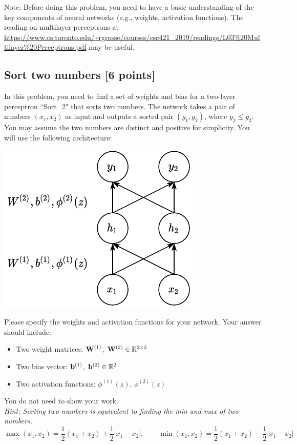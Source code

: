 \documentclass[11pt]{article}
\begin{document}
    \noindent Note: Before doing this problem, you need to have a basic understanding of the key components of neural networks (e.g., weights, activation functions). The reading on multilayer perceptrons at \url{https://www.cs.toronto.edu/~rgrosse/courses/csc421_2019/readings/L03%20Multilayer%20Perceptrons.pdf} may be useful. 
    
    \subsection{Sort two numbers {\color{blue}[6 points]}}\label{sort_2}
        In this problem, you need to find a set of weights and bias for a two-layer perceptron ``Sort\_2" that sorts two numbers. The network takes a pair of numbers $(x_1, x_2)$ as input and outputs a sorted pair $(y_1, y_2)$, where $y_1 \leq y_2$. You may assume the two numbers are distinct and positive for simplicity. You will use the following architecture:
        \begin{center}
            \includegraphics[width=0.3 \textwidth]{figures/q1.1.pdf}
        \end{center}
        
        \noindent Please specify the weights and activation functions for your network.
        Your answer should include: 
        \begin{itemize}
            \item Two weight matrices: $\mathbf{W}^{(1)}$, $\mathbf{W}^{(2)} \in \mathbb{R}^{2 \times 2}$
            \item Two bias vector: $\mathbf{b}^{(1)}$, $\mathbf{b}^{(2)} \in \mathbb{R}^{2}$ 
            \item Two activation functions: $\phi^{(1)}(z)$, $\phi^{(2)}(z)$
        \end{itemize}
        You do not need to show your work. \\
        
        \noindent \emph{Hint: Sorting two numbers is equivalent to finding the min and max of two numbers.} \\
        $$\max(x_1,x_2) = \frac{1}{2}(x_1+x_2)+\frac{1}{2}|x_1-x_2|,\qquad \min(x_1,x_2) = \frac{1}{2}(x_1+x_2)-\frac{1}{2}|x_1-x_2|$$
        
\end{document}
